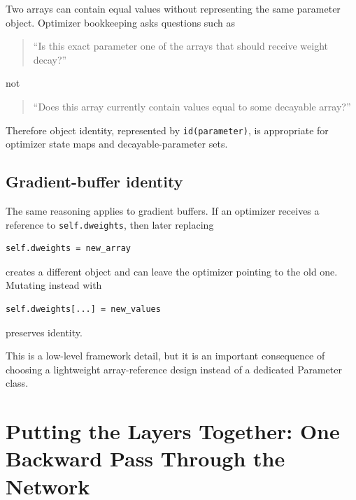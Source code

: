 \documentclass[11pt,a4paper]{article}
\newcommand{\code}[1]{\texttt{#1}}
\begin{document}
Two arrays can contain equal values without representing the same parameter object. Optimizer bookkeeping asks questions such as
\begin{quote}
``Is this exact parameter one of the arrays that should receive weight decay?''
\end{quote}
not
\begin{quote}
``Does this array currently contain values equal to some decayable array?''
\end{quote}

Therefore object identity, represented by \code{id(parameter)}, is appropriate for optimizer state maps and decayable-parameter sets.

\subsection{Gradient-buffer identity}

The same reasoning applies to gradient buffers. If an optimizer receives a reference to \code{self.dweights}, then later replacing
\begin{lstlisting}
self.dweights = new_array
\end{lstlisting}
creates a different object and can leave the optimizer pointing to the old one. Mutating instead with
\begin{lstlisting}
self.dweights[...] = new_values
\end{lstlisting}
preserves identity.

This is a low-level framework detail, but it is an important consequence of choosing a lightweight array-reference design instead of a dedicated Parameter class.

\section{Putting the Layers Together: One Backward Pass Through the Network}
\end{document}

